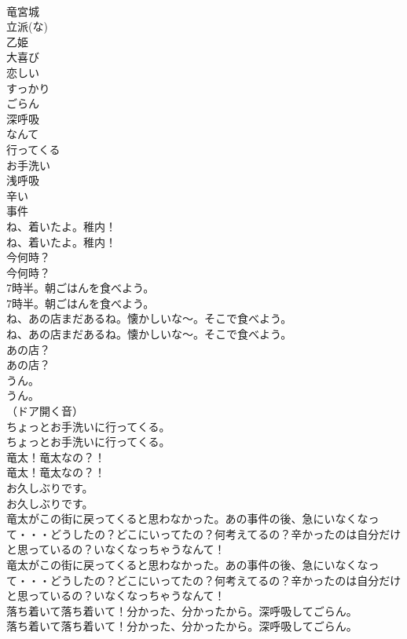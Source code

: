 \documentclass[8pt]{extreport}
\begin{document}
\begin{CJK}{UTF8}{min}
\\	竜宮城
\\	立派(な)
\\	乙姫
\\	大喜び
\\	恋しい
\\	すっかり
\\	ごらん
\\	深呼吸
\\	なんて
\\	行ってくる
\\	お手洗い
\\	浅呼吸
\\	辛い
\\	事件
\\	ね、着いたよ。稚内！	
\\	ね、着いたよ。稚内！ 
\\	今何時？	
\\	今何時？ 
\\	7時半。朝ごはんを食べよう。	
\\	7時半。朝ごはんを食べよう。 
\\	ね、あの店まだあるね。懐かしいな～。そこで食べよう。	
\\	ね、あの店まだあるね。懐かしいな～。そこで食べよう。 
\\	あの店？	
\\	あの店？ 
\\	うん。	
\\	うん。 
\\	（ドア開く音）	
\\	ちょっとお手洗いに行ってくる。	
\\	ちょっとお手洗いに行ってくる。 
\\	竜太！竜太なの？！	
\\	竜太！竜太なの？！ 
\\	お久しぶりです。	
\\	お久しぶりです。 
\\	竜太がこの街に戻ってくると思わなかった。あの事件の後、急にいなくなって・・・どうしたの？どこにいってたの？何考えてるの？辛かったのは自分だけと思っているの？いなくなっちゃうなんて！	
\\	竜太がこの街に戻ってくると思わなかった。あの事件の後、急にいなくなって・・・どうしたの？どこにいってたの？何考えてるの？辛かったのは自分だけと思っているの？いなくなっちゃうなんて！ 
\\	落ち着いて落ち着いて！分かった、分かったから。深呼吸してごらん。	
\\	落ち着いて落ち着いて！分かった、分かったから。深呼吸してごらん。 

\end{CJK}
\end{document}
